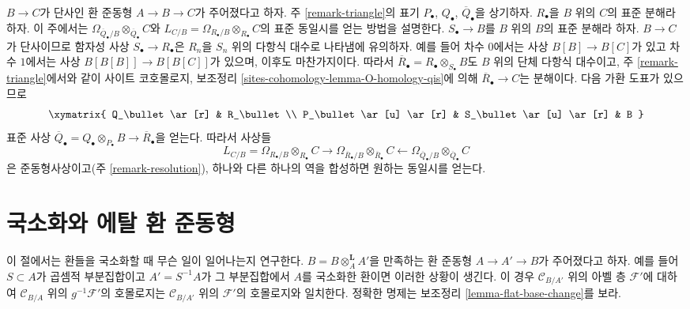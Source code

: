 \begin{remark}
\label{remark-explicit-map}
$B\to C$가 단사인 환 준동형 $A\to B\to C$가 주어졌다고 하자. 주
\ref{remark-triangle}의 표기 $P_\bullet$, $Q_\bullet$,
$\overline{Q}_\bullet$을 상기하자. $R_\bullet$을 $B$ 위의 $C$의 표준
분해라 하자. 이 주에서는
$\Omega_{\overline{Q}_\bullet/B}\otimes_{\overline{Q}_\bullet}C$와
$L_{C/B}=\Omega_{R_\bullet/B}\otimes_{R_\bullet}C$의 표준 동일시를 얻는
방법을 설명한다. $S_\bullet\to B$를 $B$ 위의 $B$의 표준 분해라 하자.
$B\to C$가 단사이므로 함자성 사상 $S_\bullet\to R_\bullet$은 $R_n$을
$S_n$ 위의 다항식 대수로 나타냄에 유의하자. 예를 들어 차수 $0$에서는
사상 $B[B]\to B[C]$가 있고 차수 $1$에서는 사상
$B[B[B]]\to B[B[C]]$가 있으며, 이후도 마찬가지이다. 따라서
$\overline{R}_\bullet=R_\bullet\otimes_{S_\bullet}B$도 $B$ 위의 단체
다항식 대수이고, 주 \ref{remark-triangle}에서와 같이 사이트 코호몰로지,
보조정리 \ref{sites-cohomology-lemma-O-homology-qis}에 의해
$\overline{R}_\bullet\to C$는 분해이다.
다음 가환 도표가 있으므로
$$
\xymatrix{
Q_\bullet \ar[r] & R_\bullet \\
P_\bullet \ar[u] \ar[r] & S_\bullet \ar[u] \ar[r] & B
}
$$
표준 사상
$\overline{Q}_\bullet=Q_\bullet\otimes_{P_\bullet}B\to
\overline{R}_\bullet$을 얻는다. 따라서 사상들
$$
L_{C/B} = \Omega_{R_\bullet/B} \otimes_{R_\bullet} C
\longrightarrow
\Omega_{\overline{R}_\bullet/B} \otimes_{\overline{R}_\bullet} C
\longleftarrow
\Omega_{\overline{Q}_\bullet/B} \otimes_{\overline{Q}_\bullet} C
$$
은 준동형사상이고(주 \ref{remark-resolution}), 하나와 다른 하나의 역을
합성하면 원하는 동일시를 얻는다.
\end{remark}





\section{국소화와 에탈 환 준동형}
\label{section-localization}

\noindent
이 절에서는 환들을 국소화할 때 무슨 일이 일어나는지 연구한다.
$B=B\otimes_A^\mathbf{L}A'$을 만족하는 환 준동형
$A\to A'\to B$가 주어졌다고 하자. 예를 들어 $S\subset A$가 곱셈적
부분집합이고 $A'=S^{-1}A$가 그 부분집합에서 $A$를 국소화한 환이면 이러한
상황이 생긴다. 이 경우 $\mathcal{C}_{B/A'}$ 위의 아벨 층
$\mathcal{F}'$에 대하여 $\mathcal{C}_{B/A}$ 위의
$g^{-1}\mathcal{F}'$의 호몰로지는 $\mathcal{C}_{B/A'}$ 위의
$\mathcal{F}'$의 호몰로지와 일치한다. 정확한 명제는 보조정리
\ref{lemma-flat-base-change}를 보라.


